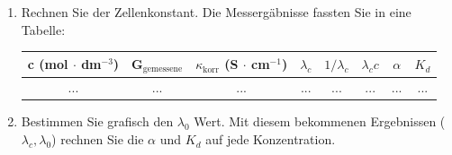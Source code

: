 \begin{enumerate}
\item Rechnen Sie der Zellenkonstant.
Die Messergäbnisse fassten Sie in eine Tabelle:

\begin{table}[!h]
\centering
\begin{tabular}{|c|c|c|c|c|c|c|c|}
\hline
c (mol $\cdot$ dm$^{-3}$) & G$_{\text{gemessene}}$ & $\kappa_{\text{korr}}$ (S $\cdot$ cm$^{-1}$) & $\lambda_c$ & $1/\lambda_c$ & $\lambda_c c$ & $\alpha$ & $K_d$ \\
\hline
... & ... & ... & ... & ... & ... & ... & ... \\
\end{tabular}
\label{table:vez}
\end{table}

\item Bestimmen Sie grafisch den $\lambda_0$ Wert. Mit diesem bekommenen Ergebnissen ($\lambda_c, \lambda_0$) rechnen Sie die $\alpha$ und $K_d$ auf jede Konzentration. 

\end{enumerate}
